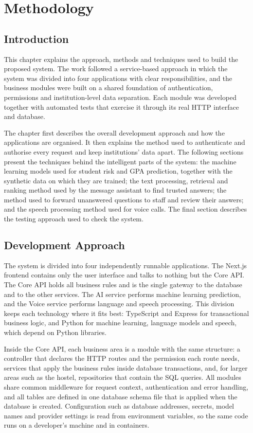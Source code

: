 \chapter{Methodology}
\label{ch:methodology}

\section{Introduction}
This chapter explains the approach, methods and techniques used to build the proposed system. The work followed a service-based approach in which the system was divided into four applications with clear responsibilities, and the business modules were built on a shared foundation of authentication, permissions and institution-level data separation. Each module was developed together with automated tests that exercise it through its real HTTP interface and database.

The chapter first describes the overall development approach and how the applications are organised. It then explains the method used to authenticate and authorise every request and keep institutions' data apart. The following sections present the techniques behind the intelligent parts of the system: the machine learning models used for student risk and GPA prediction, together with the synthetic data on which they are trained; the text processing, retrieval and ranking method used by the message assistant to find trusted answers; the method used to forward unanswered questions to staff and review their answers; and the speech processing method used for voice calls. The final section describes the testing approach used to check the system.

\section{Development Approach}
The system is divided into four independently runnable applications. The Next.js frontend contains only the user interface and talks to nothing but the Core API. The Core API holds all business rules and is the single gateway to the database and to the other services. The AI service performs machine learning prediction, and the Voice service performs language and speech processing. This division keeps each technology where it fits best: TypeScript and Express for transactional business logic, and Python for machine learning, language models and speech, which depend on Python libraries.

Inside the Core API, each business area is a module with the same structure: a controller that declares the HTTP routes and the permission each route needs, services that apply the business rules inside database transactions, and, for larger areas such as the hostel, repositories that contain the SQL queries. All modules share common middleware for request context, authentication and error handling, and all tables are defined in one database schema file that is applied when the database is created. Configuration such as database addresses, secrets, model names and provider settings is read from environment variables, so the same code runs on a developer's machine and in containers.

